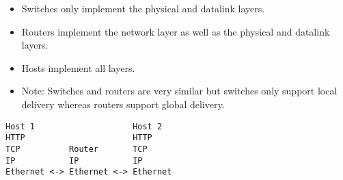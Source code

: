 \begin{itemize}
\begin{verbatim}
[TCP Header | [HTTP Header | HTTP Payload]]
\end{verbatim}

  \begin{itemize}
  \tightlist
  \item
    Network layer wraps TCP request in IP Payload
  \end{itemize}

\begin{verbatim}
[IP Header | [TCP Header | [HTTP Header | HTTP Payload]]]
\end{verbatim}

  \begin{itemize}
  \tightlist
  \item
    Data link layer wraps IP request in Ethernet payload.
  \end{itemize}

\begin{verbatim}
[Ethernet Header | [IP Header | [TCP Header | [HTTP Header | HTTP Payload]]]]
\end{verbatim}

  \begin{itemize}
  \tightlist
  \item
    This data is sent over the physical link and reversed up the stack.
  \end{itemize}
\item
  Switches only implement the physical and datalink layers.
\item
  Routers implement the network layer as well as the physical and
  datalink layers.
\item
  Hosts implement all layers.
\item
  Note: Switches and routers are very similar but switches only support
  local delivery whereas routers support global delivery.
\end{itemize}

\begin{verbatim}
Host 1                    Host 2      
HTTP                      HTTP
TCP          Router       TCP
IP           IP           IP
Ethernet <-> Ethernet <-> Ethernet
\end{verbatim}

